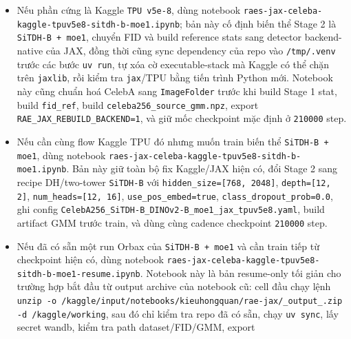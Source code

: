 \begin{itemize}[leftmargin=1.5em]
  \texttt{float16} cho full-latent DH và \texttt{--compute-dtype auto} sẽ
  upcast từng chunk fit về \texttt{float32}; nếu có ai ép
  \texttt{--compute-dtype float16} cho full flatten quá rộng thì fitter cũng
  sẽ tự promote phần KMeans/EM offline về \texttt{float32}. Nếu muốn feature
  nén có cấu trúc hơn thì có thể ép sang \texttt{pyramid\_16k}, còn
  \texttt{spatial\_mean} chỉ nên dùng khi thật sự thiếu RAM,
  rồi mới ghi config Stage 2 với block \texttt{source.enabled=true}. Route TFDS
  hay Hugging Face cho CelebA-HQ vẫn còn trong repo, nhưng không còn là flow
  mặc định của branch này.
  \item Nếu phần cứng là Kaggle \texttt{TPU v5e-8}, dùng notebook
  \texttt{raes-jax-celeba-kaggle-tpuv5e8-sitdh-b-moe1.ipynb}; bản này cố định biến
  thể Stage 2 là \texttt{SiTDH-B + moe1}, chuyển FID và build reference stats sang
  detector backend-native của JAX, đồng thời cũng sync dependency của repo vào
  \texttt{/tmp/.venv} trước các bước \texttt{uv run}, tự xóa cờ executable-stack mà
  Kaggle có thể chặn trên \texttt{jaxlib}, rồi kiểm tra \texttt{jax}/TPU bằng
  tiến trình Python mới. Notebook này cũng chuẩn hoá CelebA sang
  \texttt{ImageFolder} trước khi build Stage 1 stat, build \texttt{fid\_ref},
  build \texttt{celeba256\_source\_gmm.npz}, export
  \texttt{RAE\_JAX\_REBUILD\_BACKEND=1}, và giữ mốc checkpoint mặc định ở
  \texttt{210000} step.
  \item Nếu cần cùng flow Kaggle TPU đó nhưng muốn train biến thể
  \texttt{SiTDH-B + moe1}, dùng notebook
  \texttt{raes-jax-celeba-kaggle-tpuv5e8-sitdh-b-moe1.ipynb}. Bản này giữ toàn bộ
  fix Kaggle/JAX hiện có, đổi Stage 2 sang recipe DH/two-tower
  \texttt{SiTDH-B} với \texttt{hidden\_size=[768, 2048]},
  \texttt{depth=[12, 2]}, \texttt{num\_heads=[12, 16]},
  \texttt{use\_pos\_embed=true}, \texttt{class\_dropout\_prob=0.0}, ghi config
  \texttt{CelebA256\_SiTDH-B\_DINOv2-B\_moe1\_jax\_tpuv5e8.yaml}, build artifact
  GMM trước train, và dùng cùng cadence checkpoint \texttt{210000} step.
  \item Nếu đã có sẵn một run Orbax của \texttt{SiTDH-B + moe1} và cần train tiếp từ
  checkpoint hiện có, dùng notebook
  \texttt{raes-jax-celeba-kaggle-tpuv5e8-sitdh-b-moe1-resume.ipynb}. Notebook này
  là bản resume-only tối giản cho trường hợp bắt đầu từ output archive của
  notebook cũ: cell đầu chạy lệnh \texttt{unzip -o
  /kaggle/input/notebooks/kieuhongquan/rae-jax/\_output\_.zip -d
  /kaggle/working}, sau đó chỉ kiểm tra repo đã có sẵn, chạy \texttt{uv sync},
  lấy secret wandb, kiểm tra path dataset/FID/GMM, export

\end{itemize}
